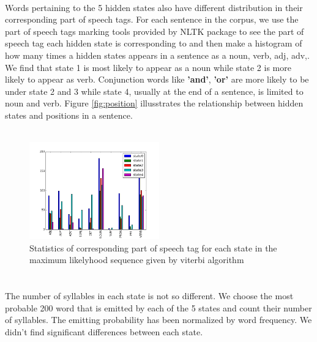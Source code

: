 \paragraph{}
Words pertaining to the 5 hidden states also have different distribution in their corresponding part of speech tags.  For each sentence in the corpus, we use the part of speech tags marking tools provided by NLTK package to see the part of speech tag each hidden state is corresponding to and then make a histogram of how many times a hidden states appears in a sentence as a noun, verb, adj, adv,. We find that state 1 is most likely to appear as a noun while state 2 is more likely to appear as verb. Conjunction words like \textbf{'and'}, \textbf{'or'} are more likely to be under state 2 and 3 while state 4, usually at the end of a sentence, is limited to noun and verb. Figure \ref{fig:position} illusstrates the relationship between hidden states and positions in a sentence.
\\
\\
 \begin{figure}[h]
 \centering
 \includegraphics[width=0.5\textwidth]{./figure/hiddenstate_partofspeechtag.png}
 \caption{Statistics of corresponding part of speech tag for each state in the maximum likelyhood sequence given by viterbi algorithm}
 \end{figure}
\paragraph{}
\section*{}
The number of syllables in each state is not so different. We choose the most probable 200 word that is emitted by each of the 5 states and count their number of syllables. The emitting probability has been normalized by word frequency. We didn’t find significant differences between each state. 


